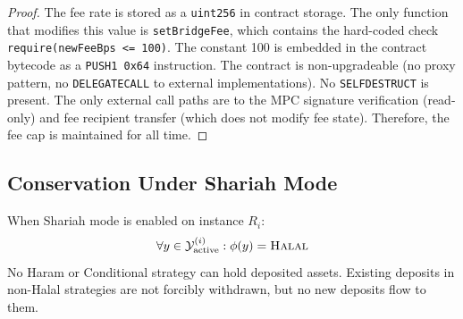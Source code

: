 \begin{proof}
The fee rate is stored as a \texttt{uint256} in contract storage. The only function that modifies this value is \texttt{setBridgeFee}, which contains the hard-coded check \texttt{require(newFeeBps <= 100)}. The constant 100 is embedded in the contract bytecode as a \texttt{PUSH1 0x64} instruction. The contract is non-upgradeable (no proxy pattern, no \texttt{DELEGATECALL} to external implementations). No \texttt{SELFDESTRUCT} is present. The only external call paths are to the MPC signature verification (read-only) and fee recipient transfer (which does not modify fee state). Therefore, the fee cap is maintained for all time.
\end{proof}

\subsection{Conservation Under Shariah Mode}

\begin{property}
\label{prop:shariah-conservation}
When Shariah mode is enabled on instance $R_i$:
\begin{equation}
  \forall y \in \mathcal{Y}_{\text{active}}^{(i)}: \phi(y) = \textsc{Halal}
\end{equation}
No Haram or Conditional strategy can hold deposited assets. Existing deposits in non-Halal strategies are not forcibly withdrawn, but no new deposits flow to them.
\end{property}

